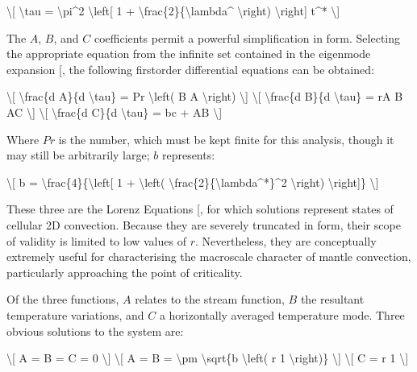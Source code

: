 \documentclass[letterpaper,10pt,english]{jupyterBook}
\begin{document}
\sphinxAtStartPar
\textbackslash{}{[} \textbackslash{}tau = \textbackslash{}pi\textasciicircum{}2 \textbackslash{}left{[} 1 + \textbackslash{}frac\{2\}\{\textbackslash{}lambda\textasciicircum{} \textbackslash{}right) \textbackslash{}right{]} t\textasciicircum{}* \textbackslash{}{]}

\sphinxAtStartPar
The \(A\), \(B\), and \(C\) coefficients permit a powerful simplification in form. Selecting the appropriate equation from the infinite set contained in the eigenmode expansion {[}\sphinxcite{references:id89}{]}, the following first\sphinxhyphen{}order differential equations can be obtained:

\sphinxAtStartPar
\textbackslash{}{[} \textbackslash{}frac\{d A\}\{d \textbackslash{}tau\} = Pr \textbackslash{}left( B \sphinxhyphen{} A \textbackslash{}right) \textbackslash{}{]}
\textbackslash{}{[} \textbackslash{}frac\{d B\}\{d \textbackslash{}tau\} = rA \sphinxhyphen{} B \sphinxhyphen{} AC \textbackslash{}{]}
\textbackslash{}{[} \textbackslash{}frac\{d C\}\{d \textbackslash{}tau\} = \sphinxhyphen{}bc + AB \textbackslash{}{]}

\sphinxAtStartPar
Where \(Pr\) is the  number, which must be kept finite for this analysis, though it may still be arbitrarily large; \(b\) represents:

\sphinxAtStartPar
\textbackslash{}{[} b = \textbackslash{}frac\{4\}\{\textbackslash{}left{[} 1 + \textbackslash{}left( \textbackslash{}frac\{2\}\{\textbackslash{}lambda\textasciicircum{}*\}\textasciicircum{}2 \textbackslash{}right) \textbackslash{}right{]}\} \textbackslash{}{]}

\sphinxAtStartPar
These three are the Lorenz Equations {[}\sphinxcite{references:id75}{]}, for which solutions represent states of cellular 2D convection. Because they are severely truncated in form, their scope of validity is limited to low values of \(r\). Nevertheless, they are conceptually extremely useful for characterising the macro\sphinxhyphen{}scale character of mantle convection, particularly approaching the point of criticality.

\sphinxAtStartPar
Of the three functions, \(A\) relates to the stream function, \(B\) the resultant temperature variations, and \(C\) a horizontally averaged temperature mode. Three obvious solutions to the system are:

\sphinxAtStartPar
\textbackslash{}{[} A = B = C = 0 \textbackslash{}{]}
\textbackslash{}{[} A = B = \textbackslash{}pm \textbackslash{}sqrt\{b \textbackslash{}left( r \sphinxhyphen{} 1 \textbackslash{}right)\} \textbackslash{}{]}
\textbackslash{}{[} C = r \sphinxhyphen{} 1 \textbackslash{}{]}
\end{document}
